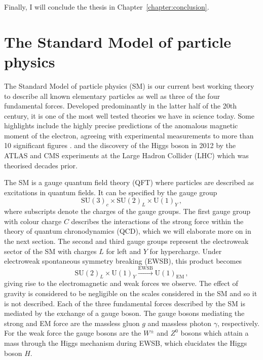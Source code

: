 \documentclass[main.tex]{subfiles}
\begin{document}
Finally, I will conclude the thesis in Chapter~\ref{chapter:conclusion}.

\section{The Standard Model of particle physics}
    The Standard Model of particle physics (SM) is our current
    best working theory to describe all known elementary particles
    as well as three of the four fundamental forces. Developed
    predominantly in the latter half of the 20th century, it is
    one of the most well tested theories we have in science today.
    Some highlights include the highly precise predictions of the
    anomalous magnetic moment of the electron, agreeing with experimental
    measurements to more than 10 significant figures \cite{Aoyama:2017uqe}.
    and the discovery of the Higgs boson in 2012 by the ATLAS \cite{ATLAS:2012yve}
    and CMS experiments \cite{CMS:2012qbp} at the Large Hadron Collider
    (LHC) which was theorised decades prior.

    The SM is a gauge quantum field theory (QFT) where particles
    are described as excitations in quantum fields. It can be specified
    by the gauge group
    \begin{equation}\label{eqn:SM_gauge}
        \mathrm{SU}(3)_{c} \times \mathrm{SU}(2)_{L} \times \mathrm{U}(1)_{Y}\, ,
    \end{equation}
    where subscripts denote the charges of the gauge groups. The first gauge
    group with colour charge $C$ describes the interactions of the
    strong force within the theory of quantum chronodynamics (QCD), which we
    will elaborate more on in the next section. The second
    and third gauge groups represent the electroweak sector of the SM with
    charges $L$ for left and $Y$ for hypercharge. Under electroweak
    spontaneous symmetry breaking (EWSB), this product becomes
    \begin{equation}\label{eqn:SM_SSB}
        \mathrm{SU}(2)_{L} \times \mathrm{U}(1)_{Y} \xrightarrow{\mathrm{EWSB}} \mathrm{U}(1)_{\mathrm{EM}} \, ,
    \end{equation}
    giving rise to the electromagnetic and weak forces we observe.
    The effect of gravity is considered to be negligible on the scales
    considered in the SM and so it is not described.
    Each of the three fundamental forces described by the SM is mediated
    by the exchange of a gauge boson. The gauge bosons mediating the strong
    and EM force are the massless gluon $g$ and massless photon $\gamma$,
    respectively. For the weak force the gauge bosons are the $W^{\pm}$
    and $Z^{0}$ bosons which attain a mass through the Higgs mechanism \cite{Englert:1964et,Higgs:1964pj,Guralnik:1964eu}
    during EWSB, which elucidates the Higgs boson $H$.
\end{document}
